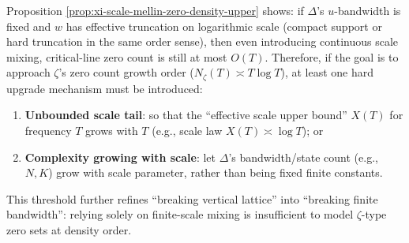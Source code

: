 \begin{remark}\label{rem:xi-scale-mellin-density-threshold}
Proposition \ref{prop:xi-scale-mellin-zero-density-upper} shows: if \(\Delta\)'s \(u\)-bandwidth is fixed and \(w\) has effective truncation on logarithmic scale (compact support or hard truncation in the same order sense), then even introducing continuous scale mixing, critical-line zero count is still at most \(O(T)\).
Therefore, if the goal is to approach \(\zeta\)'s zero count growth order (\(N_\zeta(T)\asymp T\log T\)), at least one hard upgrade mechanism must be introduced:
\begin{enumerate}
  \item \textbf{Unbounded scale tail}: so that the ``effective scale upper bound'' \(X(T)\) for frequency \(T\) grows with \(T\) (e.g., scale law \(X(T)\asymp \log T\)); or
  \item \textbf{Complexity growing with scale}: let \(\Delta\)'s bandwidth/state count (e.g., \(N,K\)) grow with scale parameter, rather than being fixed finite constants.
\end{enumerate}
This threshold further refines ``breaking vertical lattice'' into ``breaking finite bandwidth'': relying solely on finite-scale mixing is insufficient to model \(\zeta\)-type zero sets at density order.
\end{remark}

